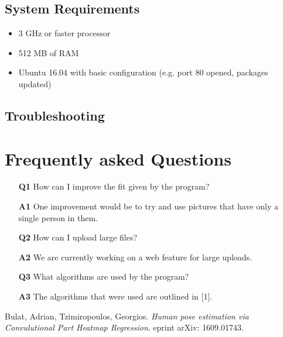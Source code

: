 \documentclass{scrreprt}
\begin{document}
\subsection{System Requirements}

\begin{itemize}
\item 3 GHz or faster processor
\item 512 MB of RAM
\item Ubuntu 16.04 with basic configuration (e.g. port 80 opened, packages updated)
\end{itemize}


\subsection{Troubleshooting}

\section{Frequently asked Questions}

\begin{enumerate}
        \item[\textbf{Q1}] How can I improve the fit given by the program?

        \item[\textbf{A1}] One improvement would be to try and use pictures that have only a single person in them.

        \item[\textbf{Q2}] How can I upload large files?

        \item[\textbf{A2}] We are currently working on a web feature for large uploads.

        \item[\textbf{Q3}] What algorithms are used by the program?

        \item[\textbf{A3}] The algorithms that were used are outlined in [1].
\end{enumerate}

\begin{thebibliography}{9}

Bulat, Adrian, Tzimiropoulos, Georgios.
\textit{Human pose estimation via Convulutional Part Heatmap Regression}.
eprint arXiv: 1609.01743.

\end{thebibliography}
\end{document}
